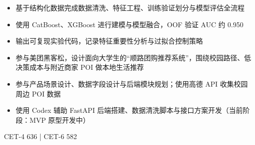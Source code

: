 \documentclass{common/resume}
\begin{document}
\begin{itemize}
  \item 基于结构化数据完成数据清洗、特征工程、训练验证划分与模型评估全流程
  \item 使用 CatBoost、XGBoost 进行建模与模型融合，OOF 验证 AUC 约 0.950
  \item 输出可复现实验代码，记录特征重要性分析与过拟合控制策略
\end{itemize}

\begin{itemize}
  \item 参与美团黑客松，设计面向大学生的“顺路团购推荐系统”，围绕校园路径、低决策成本与附近商家 POI 做本地生活推荐
  \item 参与产品场景设计、数据字段设计与后端模块规划；使用高德 API 收集校园周边 POI 数据
  \item 使用 Codex 辅助 FastAPI 后端搭建、数据清洗脚本与接口方案开发（当前阶段：MVP 原型开发中）
\end{itemize}

CET-4 636 \quad | \quad CET-6 582
\end{document}
